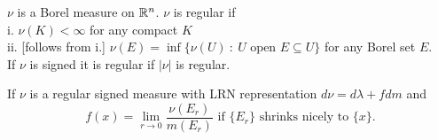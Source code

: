 \begin{dfn}
$\nu$ is a Borel measure on ${\mathbb R}^n$. $\nu$ is regular if \\
i. $\nu(K)< \infty$ for any compact $K$ \\
ii. [follows from i.] $\nu(E) = \inf \{ \nu(U) \ : \ U \text{ open } E \subseteq  U\}$ for any Borel set $E$. \\
If $\nu$ is signed it is regular if $|\nu|$ is regular.
\end{dfn}

\begin{thm}
If $\nu$ is a regular signed measure with LRN representation $d \nu = d \lambda + f dm$ and 
 \[
f(x) = \lim_{r \rightarrow 0} \frac{\nu(E_r)}{m(E_r)} \text{ if } \{ E_r \} \text{ shrinks nicely to } \{ x \}.
\]	
\end{thm}




